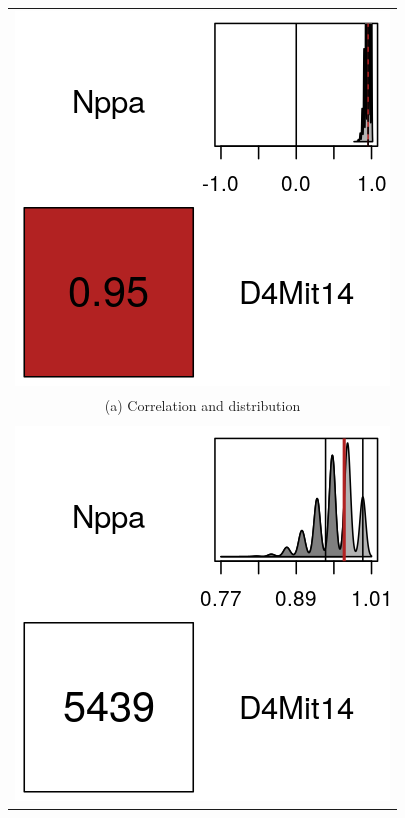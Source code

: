 \documentclass[sts]{imsart}
\begin{document}
\begin{figure}[t]
  \begin{center}
    \begin{tabular}{c}
      \includegraphics[scale = 0.5]{../img/bsbCorr2by2.png} \\
      {\footnotesize (a) Correlation and distribution} \\
      \\
      \includegraphics[scale = 0.5]{../img/bsbCorrTest2by2.png} \\

\end{tabular}
\end{center}
\end{figure}
\end{document}
